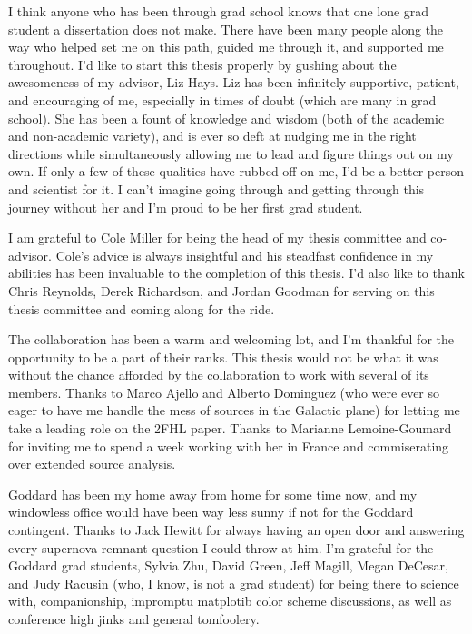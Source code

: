 



I think anyone who has been through grad school knows that one lone grad student a dissertation does not make. There have been many people along the way who helped set me on this path, guided me through it, and  supported me throughout. I'd like to start this thesis properly by gushing about the awesomeness of my advisor, Liz Hays. Liz has been infinitely supportive, patient, and encouraging of me, especially in times of doubt (which are many in grad school). She has been a fount of knowledge and wisdom (both of the academic and non-academic variety), and is ever so deft at nudging me in the right directions while simultaneously allowing me to lead and figure things out on my own. If only a few of these qualities have rubbed off on me, I'd be a better person and scientist for it. I can't imagine going through and getting through this journey without her and I'm proud to be her first grad student. 

I am grateful to Cole Miller for being the head of my thesis committee and co-advisor. Cole's advice is always insightful and his steadfast confidence in my abilities has been invaluable to the completion of this thesis. I'd also like to thank Chris Reynolds, Derek Richardson, and Jordan Goodman for serving on this thesis committee and coming along for the ride.

The \Fermi{} collaboration has been a warm and welcoming lot, and I'm thankful for the opportunity to be a part of their ranks. This thesis would not be what it was without the chance afforded by the collaboration to work with several of its members. Thanks to Marco Ajello and  Alberto Dominguez (who were ever so eager to have me handle the mess of sources in the Galactic plane) for letting me take a leading role on the 2FHL paper. Thanks to Marianne Lemoine-Goumard for inviting me to spend a week working with her in France and commiserating over extended source analysis. 

Goddard has been my home away from home for some time now, and my windowless office would have been way less sunny if not for the Goddard \Fermi{} contingent. Thanks to Jack Hewitt for always having an open door and answering every supernova remnant question I could throw at him. I'm grateful for the Goddard \Fermi{} grad students, Sylvia Zhu, David Green, Jeff Magill, Megan DeCesar, and Judy Racusin (who, I know, is not a grad student) for being there to science with, companionship, impromptu matplotib color scheme discussions, as well as conference high jinks and general tomfoolery. 

